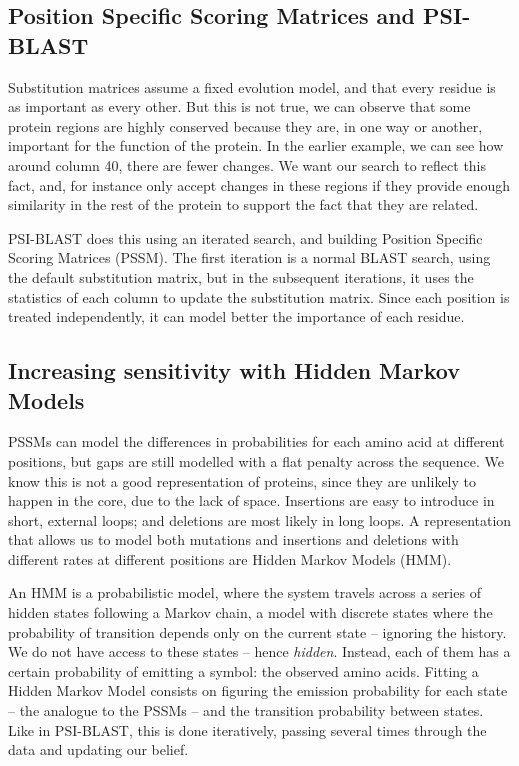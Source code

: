 \subsection{Position Specific Scoring Matrices and PSI-BLAST}

Substitution matrices assume a fixed evolution model, and that every residue is as important as every other.
But this is not true, we can observe that some protein regions are highly conserved because they are, in one way or another, important for the function of the protein.
In the earlier example, we can see how around column 40, there are fewer changes.
We want our search to reflect this fact, and, for instance only accept changes in these regions if they provide enough similarity in the rest of the protein to support the fact that they are related.

PSI-BLAST does this using an iterated search, and building Position Specific Scoring Matrices (PSSM).
The first iteration is a normal BLAST search, using the default substitution matrix, but in the subsequent iterations, it uses the statistics of each column to update the substitution matrix.
Since each position is treated independently, it can model better the importance of each residue.

\subsection{Increasing sensitivity with Hidden Markov Models}
PSSMs can model the differences in probabilities for each amino acid at different positions, but gaps are still modelled with a flat penalty across the sequence.
We know this is not a good representation of proteins, since they are unlikely to happen in the core, due to the lack of space.
Insertions are easy to introduce in short, external loops; and deletions are most likely in long loops. 
A representation that allows us to model both mutations and insertions and deletions with different rates at different positions are Hidden Markov Models (HMM).

An HMM  is a probabilistic model, where the system travels across a series of hidden states following a Markov chain, a model with discrete states where the probability of transition depends only on the current state -- ignoring the history.
We do not have access to these states -- hence \emph{hidden}.
Instead, each of them has a certain probability of emitting a symbol: the observed amino acids.
Fitting a Hidden Markov Model consists on figuring the emission probability for each state -- the analogue to the PSSMs -- and the transition probability between states.
Like in PSI-BLAST, this is done iteratively, passing several times through the data and updating our belief.

